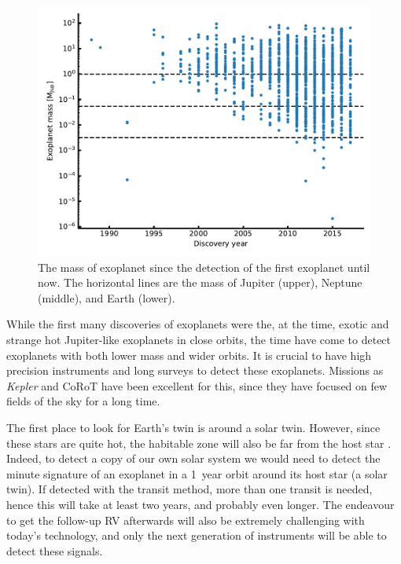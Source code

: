 \begin{figure}[htpb!]
    \centering
    \includegraphics[width=0.8\linewidth]{figures/exoplanetMass.pdf}
    \caption{The mass of exoplanet since the detection of the first exoplanet until now. The
             horizontal lines are the mass of Jupiter (upper), Neptune (middle), and Earth (lower).}
    \label{fig:exoplanetMass}
\end{figure}

While the first many discoveries of exoplanets were the, at the time, exotic and strange hot
Jupiter-like exoplanets in close orbits, the time have come to detect exoplanets with both lower
mass and wider orbits. It is crucial to have high precision instruments and long surveys to detect
these exoplanets. Missions as \emph{Kepler} and CoRoT have been excellent for this, since they have
focused on few fields of the sky for a long time.

The first place to look for Earth's twin is around a solar twin. However, since these stars are
quite hot, the habitable zone will also be far from the host star \citep[see e.g.]{Kasting1993}.
Indeed, to detect a copy of our own solar system we would need to detect the minute signature of an
exoplanet in a \SI{1}{year} orbit around its host star (a solar twin). If detected with the transit
method, more than one transit is needed, hence this will take at least two years, and probably even
longer. The endeavour to get the follow-up RV afterwards will also be extremely challenging with
today's technology, and only the next generation of instruments will be able to detect these
signals.


